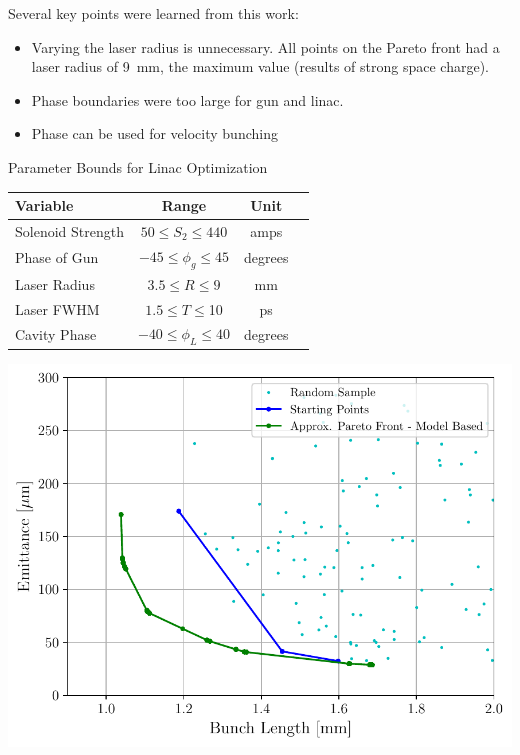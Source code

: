 \documentclass[portrait,final,paperwidth=92cm, paperheight=152cm,  fontscale=0.277]{baposter}
\begin{document}
\begin{poster}
{\begin{center}
\begin{minipage}{0.5\textwidth}
Several key points were learned from this work:
\begin{itemize}
	\item Varying the laser radius is unnecessary. 
	All points on the Pareto front	had a laser radius of \SI{9}{mm}, the maximum value (results of strong space charge).
	\item Phase boundaries were too large for gun and linac.
	\item Phase can be used for velocity bunching	
\end{itemize}
		
\vspace{3em}
		\begin{singlespace}
			\centering
			
			Parameter Bounds for Linac Optimization
			
			\begin{tabular}{ l *{3}{c}}
				\hline%
				\textbf{Variable} & \textbf{Range} & \textbf{Unit} \\
				\hline%
				Solenoid Strength & $ 50 \le S_2 \le 440$  & amps \\
				Phase of Gun & $-45 \le \phi_g \le 45$  & degrees \\
				Laser Radius  & $3.5 \le R \le 9$  & mm \\
				Laser FWHM & $1.5 \le T \le $10  & ps \\
				Cavity Phase & $-40 \le \phi_L \le 40$  & degrees \\
				\hline%
			\end{tabular}
		\end{singlespace}
	\end{minipage}\hspace{1em}
	\begin{minipage}{0.48\textwidth}
		\centering
		\includegraphics[width=1\textwidth]{THPMF049f2}
		

\end{minipage}
\end{center}}
\end{poster}
\end{document}
